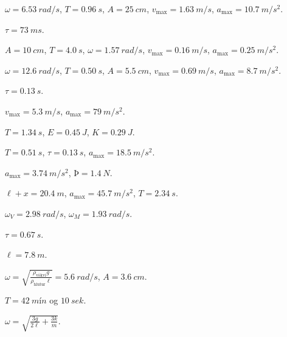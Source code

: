 \ifdefined \wholebook \else\documentclass[oneside]{book}\usepackage{EdlBook}\graphicspath{{figures/}}
\begin{document}
\begin{enumerate*}[label = \vspace{0.15cm} \textbf{(\arabic*)}]
  \item $\omega = \SI{6.53}{rad/s}$, $T = \SI{0.96}{s}$, $A = \SI{25}{cm}$, $v_{\text{max}} = \SI{1.63}{m/s}$, $a_{\text{max}} = \SI{10.7}{m/s^2}$.
  \item $\tau = \SI{73}{ms}$.
  \item $A = \SI{10}{cm}$, $T = \SI{4.0}{s}$, $\omega = \SI{1.57}{rad/s}$, $v_{\text{max}} = \SI{0.16}{m/s}$, $a_{\text{max}} = \SI{0.25}{m/s^2}$.
  \item $\omega = \SI{12.6}{rad/s}$, $T = \SI{0.50}{s}$, $A = \SI{5.5}{cm}$, $v_{\text{max}} = \SI{0.69}{m/s}$, $a_{\text{max}} = \SI{8.7}{m/s^2}$.
  \item $\tau = \SI{0.13}{s}$.
  \item $v_{\text{max}} = \SI{5.3}{m/s}$, $a_{\text{max}} = \SI{79}{m/s^2}$.
  \item $T = \SI{1.34}{s}$, $E = \SI{0.45}{J}$, $K = \SI{0.29}{J}$.
  \item $T = \SI{0.51}{s}$, $\tau = \SI{0.13}{s}$, $a_{\text{max}} = \SI{18.5}{m/s^2}$.
  \item $a_{\text{max}} = \SI{3.74}{m/s^2}$, $Þ = \SI{1.4}{N}$.
  \item $\ell + x = \SI{20.4}{m}$, $a_{\text{max}} = \SI{45.7}{m/s^2}$, $T = \SI{2.34}{s}$.
  \item $\omega_V = \SI{2.98}{rad/s}$, $\omega_M = \SI{1.93}{rad/s}$.
  \item $\tau = \SI{0.67}{s}$.
  \item $\ell = \SI{7.8}{m}$.
  \item $\omega = \sqrt{\frac{\rho_{\text{vökvi}}g}{\rho_{\text{hlutur}}\ell}} = \SI{5.6}{rad/s}$, $A = \SI{3.6}{cm}$.
  \item $T = \SI{42}{mín}$ og $\SI{10}{sek}$. 
  \item $\omega = \sqrt{\frac{3g}{2\ell} + \frac{3k}{m}}$.
\end{enumerate*}



\ifdefined \wholebook \else
 \printindex
\end{document}
